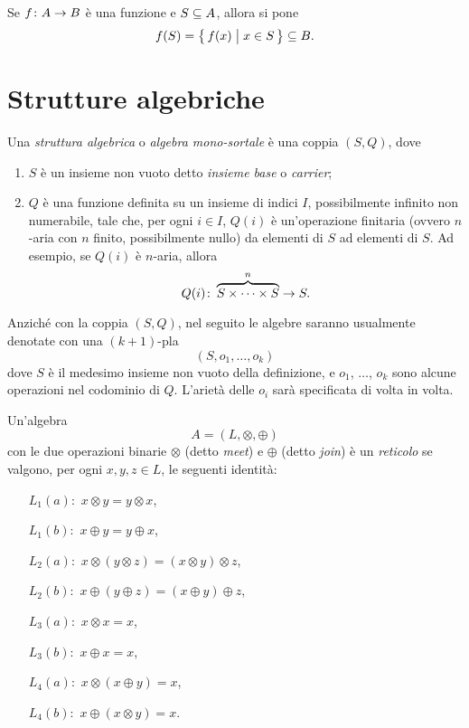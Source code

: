 Se $\mathord{f}\colon A\to B$ \`e una funzione e $S \subseteq A$, allora si pone
\[
    f(S) = \bigl\{\, f(x) \bigm| x \in S \,\bigr\} \subseteq B.
\]


\section{Strutture algebriche}

\begin{definizione} 
Una \emph{struttura algebrica} o \emph{algebra mono-sortale}
\`e una coppia $(S, Q)$, dove
\begin{enumerate}
\item
$S$ \`e un insieme non vuoto detto \emph{insieme base} o \emph{carrier};
\item
$Q$ \`e una funzione definita su un insieme di indici $I$,
possibilmente infinito non numerabile, tale che, per ogni $i \in I$,
$Q(i)$ \`e un'operazione finitaria (ovvero $n$-aria con $n$ finito,
possibilmente nullo) da elementi di $S$ ad elementi di $S$. Ad
esempio, se $Q(i)$ \`e $n$-aria, allora
\[
    \mathord{Q(i)}\colon\overbrace{S \times\cdots\times S}^{n}\to S.
\]
\end{enumerate}
\end{definizione}

Anzich\'e con la coppia $(S, Q)$, nel seguito le algebre saranno
usualmente denotate con una $(k+1)$-pla
\[
    (S, o_1, \ldots, o_k)
\]
dove $S$ \`e il medesimo insieme non vuoto della definizione, e $o_1$,
$\ldots$, $o_k$ sono alcune operazioni nel codominio di $Q$. L'ariet\`a
delle $o_i$ sar\`a specificata di volta in volta.

\begin{definizione} 
\label{def:reticolo1}
Un'algebra
\[
    A = (L, \otimes, \oplus)
\]
con le due operazioni binarie $\otimes$ (detto \emph{meet}) e $\oplus$ (detto
\emph{join}) \`e un \emph{reticolo} se valgono, per ogni $x, y, z \in L$,
le seguenti identit\`a:
\begin{itemize}
\item[$L_1 (a):$] $x \otimes y = y \otimes x$,
\item[$L_1 (b):$] $x \oplus  y = y \oplus  x$,
\item[$L_2 (a):$] $x \otimes (y \otimes z) = (x \otimes y) \otimes z$,
\item[$L_2 (b):$] $x \oplus  (y \oplus  z) = (x \oplus  y) \oplus  z$,
\item[$L_3 (a):$] $x \otimes x = x$,
\item[$L_3 (b):$] $x \oplus  x = x$,
\item[$L_4 (a):$] $x \otimes (x \oplus  y) = x$,
\item[$L_4 (b):$] $x \oplus  (x \otimes y) = x$.
\end{itemize}
\end{definizione}

